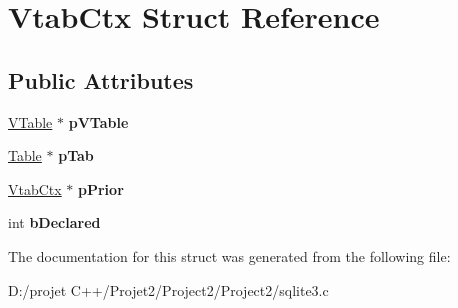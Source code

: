 \hypertarget{struct_vtab_ctx}{}\section{Vtab\+Ctx Struct Reference}
\label{struct_vtab_ctx}
\subsection*{Public Attributes}
\begin{DoxyCompactItemize}
\item 
\mbox{\label{struct_vtab_ctx_a99bbe533ea0423138d7dddba5aa662b8}} 
\mbox{\hyperlink{struct_v_table}{V\+Table}} $\ast$ {\bfseries p\+V\+Table}
\item 
\mbox{\label{struct_vtab_ctx_a4040cb18a83afebad0ad7e7f20572b09}} 
\mbox{\hyperlink{struct_table}{Table}} $\ast$ {\bfseries p\+Tab}
\item 
\mbox{\label{struct_vtab_ctx_a0100b21d6b04d3b7565f1315b9008385}} 
\mbox{\hyperlink{struct_vtab_ctx}{Vtab\+Ctx}} $\ast$ {\bfseries p\+Prior}
\item 
\mbox{\label{struct_vtab_ctx_a3e4936f41e9dc9a8ee37f35b9aec90d8}} 
int {\bfseries b\+Declared}
\end{DoxyCompactItemize}


The documentation for this struct was generated from the following file\+:\begin{DoxyCompactItemize}
\item 
D\+:/projet C++/\+Projet2/\+Project2/\+Project2/sqlite3.\+c\end{DoxyCompactItemize}
